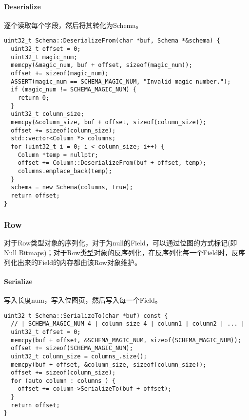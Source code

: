 \documentclass[12pt,hyperref,a4paper,UTF8]{ctexart}
\begin{document}
\paragraph{Deserialize}

逐个读取每个字段，然后将其转化为Schema。

\begin{verbatim}
uint32_t Schema::DeserializeFrom(char *buf, Schema *&schema) {
  uint32_t offset = 0;
  uint32_t magic_num;
  memcpy(&magic_num, buf + offset, sizeof(magic_num));
  offset += sizeof(magic_num);
  ASSERT(magic_num == SCHEMA_MAGIC_NUM, "Invalid magic number.");
  if (magic_num != SCHEMA_MAGIC_NUM) {
    return 0;
  }
  uint32_t column_size;
  memcpy(&column_size, buf + offset, sizeof(column_size));
  offset += sizeof(column_size);
  std::vector<Column *> columns;
  for (uint32_t i = 0; i < column_size; i++) {
    Column *temp = nullptr;
    offset += Column::DeserializeFrom(buf + offset, temp);
    columns.emplace_back(temp);
  }
  schema = new Schema(columns, true);
  return offset;
}
\end{verbatim}

\subsubsection{Row}

对于Row类型对象的序列化，对于为null的Field，可以通过位图的方式标记(即 Null Bitmaps)；对于Row类型对象的反序列化，在反序列化每一个Field时，反序列化出来的Field的内存都由该Row对象维护。

\paragraph{Serialize}

写入长度num，写入位图页，然后写入每一个Field。

\begin{verbatim}
uint32_t Schema::SerializeTo(char *buf) const {
  // | SCHEMA_MAGIC_NUM 4 | column size 4 | column1 | column2 | ... |
  uint32_t offset = 0;
  memcpy(buf + offset, &SCHEMA_MAGIC_NUM, sizeof(SCHEMA_MAGIC_NUM));
  offset += sizeof(SCHEMA_MAGIC_NUM);
  uint32_t column_size = columns_.size();
  memcpy(buf + offset, &column_size, sizeof(column_size));
  offset += sizeof(column_size);
  for (auto column : columns_) {
    offset += column->SerializeTo(buf + offset);
  }
  return offset;
}
\end{verbatim}
\end{document}
